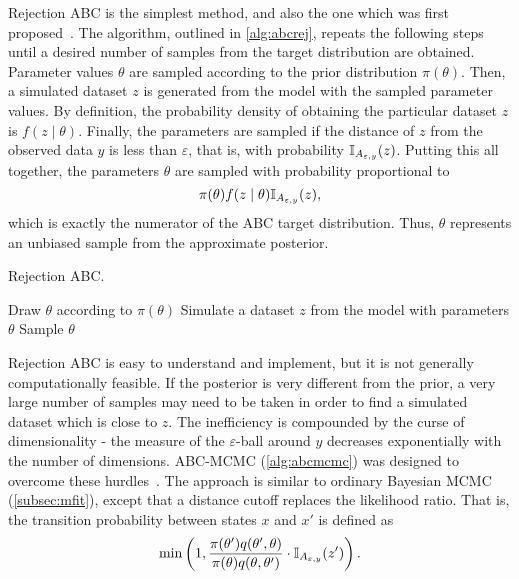 Rejection ABC is the simplest method, and also the one which was first
proposed~\autocite{rubin1984bayesianly, tavare1997inferring}. The algorithm,
outlined in \cref{alg:abcrej}, repeats the following steps until a desired
number of samples from the target distribution are obtained. Parameter values
$\theta$ are sampled according to the prior distribution $\pi(\theta)$. Then, a
simulated dataset $z$ is generated from the model with the sampled parameter
values. By definition, the probability density of obtaining the particular
dataset $z$ is $f(z \mid \theta)$. Finally, the parameters are sampled if the
distance of $z$ from the observed data $y$ is less than $\varepsilon$, that is,
with probability $\mathbb{I}_{A_{\varepsilon, y}}(z)$. Putting this all together, the
parameters $\theta$ are sampled with probability proportional to
\[
  \pi(\theta) f(z \mid \theta) \mathbb{I}_{A_{\varepsilon, y}}(z),
\]
which is exactly the numerator of the \gls{ABC} target distribution. Thus,
$\theta$ represents an unbiased sample from the approximate posterior.

\begin{algorithm}
  \caption{Rejection \gls{ABC}.}
  \begin{algorithmic}
    \Loop
      \State Draw $\theta$ according to $\pi(\theta)$
      \State Simulate a dataset $z$ from the model with parameters $\theta$
        \State Sample $\theta$
      \EndIf
    \EndLoop
  \end{algorithmic}
  \label{alg:abcrej}
\end{algorithm}

Rejection \gls{ABC} is easy to understand and implement, but it is not
generally computationally feasible. If the posterior is very different from the
prior, a very large number of samples may need to be taken in order to find a
simulated dataset which is close to $z$. The inefficiency is compounded
by the curse of dimensionality - the measure of the $\varepsilon$-ball around
$y$ decreases exponentially with the number of dimensions.
\gls{ABC}-\gls{MCMC} (\cref{alg:abcmcmc}) was designed to overcome these
hurdles~\autocite{marjoram2003markov}. The approach is similar to ordinary
Bayesian \gls{MCMC} (\cref{subsec:mfit}), except that a distance cutoff
replaces the likelihood ratio. That is, the transition probability between
states $x$ and $x'$ is defined as
\[
  \min\left(1, \frac{\pi(\theta') q(\theta', \theta)}
                    {\pi(\theta) q(\theta, \theta')} 
    \cdot \mathbb{I}_{A_{\varepsilon, y}}(z') \right).
\]

